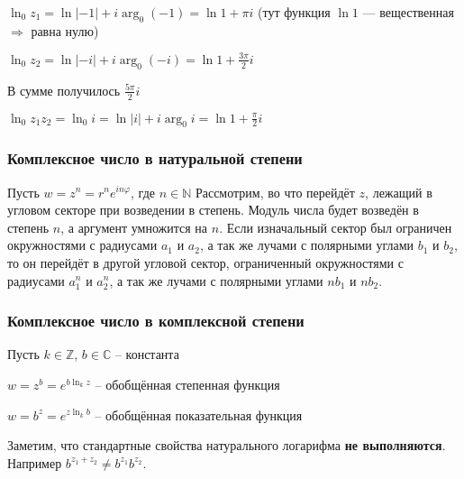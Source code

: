 $\ln_0{z_1}=\ln{|-1|}+i\arg_0{(-1)}=\ln{1} + \pi i$ (тут функция $\ln{1}$ --- вещественная $\Rightarrow$ равна нулю)

$\ln_0{z_2}=\ln{|-i|}+i\arg_0{(-i)}=\ln{1} + \frac{3\pi}{2} i$

В сумме получилось $\frac{5\pi}{2}i$

$\ln_0{z_1z_2}=\ln_0{i}=\ln{|i|} + i\arg_0{i} = \ln{1} + \frac{\pi}{2}i$

\subsubsection{Комплексное число в натуральной степени}
Пусть $w=z^n=r^ne^{in\varphi}$, где $n\in\mathbb{N}$
Рассмотрим, во что перейдёт $z$, лежащий в угловом секторе при возведении в степень. Модуль числа будет возведён в степень $n$, а аргумент умножится на $n$. Если изначальный сектор был ограничен окружностями с радиусами $a_1$ и $a_2$, а так же лучами с полярными углами $b_1$ и $b_2$, то он перейдёт в другой угловой сектор, ограниченный окружностями с радиусами $a_1^n$ и $a_2^n$, а так же лучами с полярными углами $nb_1$ и $nb_2$.

\subsubsection{Комплексное число в комплексной степени}
Пусть $k\in\mathbb{Z}$, $b\in\mathbb{C}$ -- константа

$w=z^b=e^{b\ln_k{z}}$ -- обобщённая степенная функция

$w=b^z=e^{z\ln_k{b}}$ -- обобщённая показательная функция

Заметим, что стандартные свойства натурального логарифма \textbf{не выполняются}. Например $b^{z_1 + z_2} \neq b^{z_1} b^{z_2}$.

